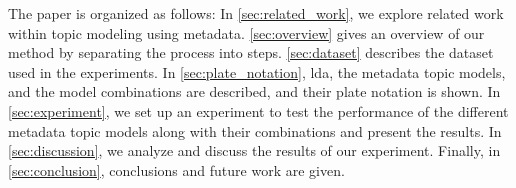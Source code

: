 The paper is organized as follows:
In \autoref{sec:related_work}, we explore related work within topic modeling using metadata.
\autoref{sec:overview} gives an overview of our method by separating the process into steps.
\autoref{sec:dataset} describes the dataset used in the experiments.
In \autoref{sec:plate_notation}, \gls{lda}, the metadata topic models, and the model combinations are described, and their plate notation is shown.
In \autoref{sec:experiment}, we set up an experiment to test the performance of the different metadata topic models along with their combinations and present the results.
In \autoref{sec:discussion}, we analyze and discuss the results of our experiment.
Finally, in \autoref{sec:conclusion}, conclusions and future work are given.
